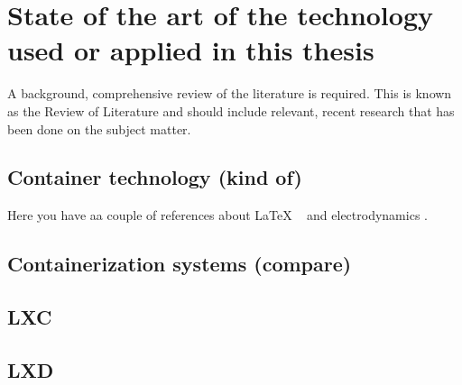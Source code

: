 \clearpage\section{State of the art of the technology used or applied in this thesis}

A background, comprehensive review of the literature is required. This is known as the Review of Literature and should include relevant, recent research that has been done on the subject matter.

\subsection{Container technology (kind of)}

Here you have aa couple of references about LaTeX ~\cite{latexcompanion} and electrodynamics \cite{einstein}.

\bigskip
\subsection{Containerization systems (compare)}

\subsection{LXC}
\subsection{LXD}
